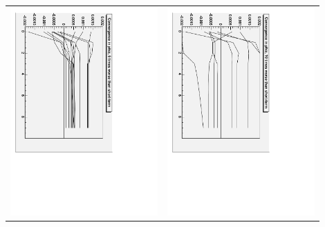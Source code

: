 \documentclass[compress]{beamer}
\begin{document}
\begin{frame}
\begin{center}
\begin{tabular}{p{0.45\linewidth} p{0.45\linewidth}}
\includegraphics[height=\linewidth, angle=90]{phiz_conv_times5.pdf} &
\includegraphics[height=\linewidth, angle=90]{phiz_conv_times10.pdf}
\end{tabular}
\end{center}
\end{frame}
\end{document}

